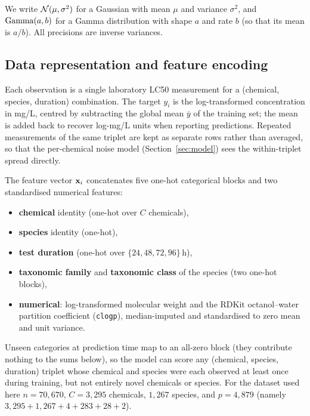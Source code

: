 We write $\mathcal{N}(\mu,\sigma^2)$ for a Gaussian with mean $\mu$ and variance
$\sigma^2$, and $\mathrm{Gamma}(a,b)$ for a Gamma distribution with shape $a$ and rate $b$
(so that its mean is $a/b$). All precisions are inverse variances.

\subsection{Data representation and feature encoding}
\label{sec:features}

Each observation is a single laboratory LC50 measurement for a
(chemical, species, duration) combination. The target $y_i$ is the
log-transformed concentration in mg/L, centred by subtracting the global mean
$\bar{y}$ of the training set; the mean is added back to recover log-mg/L units
when reporting predictions. Repeated measurements of the same triplet are kept
as separate rows rather than averaged, so that the per-chemical noise model
(Section~\ref{sec:model}) sees the within-triplet spread directly.

The feature vector $\mathbf{x}_i$ concatenates five one-hot categorical blocks and two
standardised numerical features:
\begin{itemize}
  \item \textbf{chemical} identity (one-hot over $C$ chemicals),
  \item \textbf{species} identity (one-hot),
  \item \textbf{test duration} (one-hot over $\{24,48,72,96\}$\,h),
  \item \textbf{taxonomic family} and \textbf{taxonomic class} of the species (two one-hot blocks),
  \item \textbf{numerical}: log-transformed molecular weight and the RDKit
        octanol--water partition coefficient (\texttt{clogp}), median-imputed
        and standardised to zero mean and unit variance.
\end{itemize}
Unseen categories at prediction time map to an all-zero block (they contribute
nothing to the sums below), so the model can score any (chemical, species,
duration) triplet whose chemical and species were each observed at least once
during training, but not entirely novel chemicals or species. For the dataset
used here $n=70{,}670$, $C=3{,}295$ chemicals, $1{,}267$ species, and
$p=4{,}879$ (namely $3{,}295+1{,}267+4+283+28+2$).

